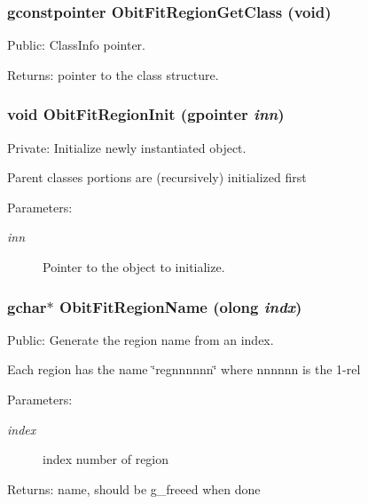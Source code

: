 \subsubsection{\setlength{\rightskip}{0pt plus 5cm}gconstpointer Obit\-Fit\-Region\-Get\-Class (void)}\label{ObitFitRegion_8c_a7}


Public: Class\-Info pointer. 

\begin{Desc}
\item[Returns:]pointer to the class structure. \end{Desc}
\subsubsection{\setlength{\rightskip}{0pt plus 5cm}void Obit\-Fit\-Region\-Init (gpointer {\em inn})}\label{ObitFitRegion_8c_a3}


Private: Initialize newly instantiated object. 

Parent classes portions are (recursively) initialized first \begin{Desc}
\item[Parameters:]
\begin{description}
\item[{\em inn}]Pointer to the object to initialize. \end{description}
\end{Desc}
\subsubsection{\setlength{\rightskip}{0pt plus 5cm}gchar$\ast$ Obit\-Fit\-Region\-Name ({\bf olong} {\em indx})}\label{ObitFitRegion_8c_a12}


Public: Generate the region name from an index. 

Each region has the name \char`\"{}regnnnnnn\char`\"{} where nnnnnn is the 1-rel \begin{Desc}
\item[Parameters:]
\begin{description}
\item[{\em index}]index number of region \end{description}
\end{Desc}
\begin{Desc}
\item[Returns:]name, should be g\_\-freeed when done \end{Desc}
